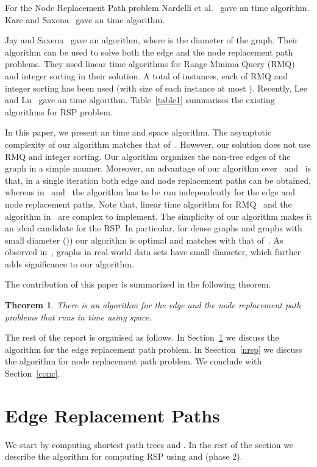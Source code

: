 \documentclass[11pt,a4paper]{llncs}
\newtheorem{thm}{Theorem}
\begin{document}
For the Node Replacement Path problem Nardelli et al.~\cite{mostvn} gave an 
time algorithm. Kare and Saxena~\cite{asksax} gave an  time algorithm.

Jay and Saxena~\cite{jay} gave an  algorithm, where  is the diameter of the graph.
Their algorithm can be used to solve both the edge and the node
replacement path problems. They used linear time algorithms for Range Minima Query
(RMQ)~\cite{rmq} and integer sorting in their solution. A total of  instances, each of
RMQ and integer sorting has been used (with size of each instance at most ).
Recently, Lee and Lu~\cite{linearrsp} gave an  time algorithm.
Table~\ref{table1} summarises the existing algorithms for RSP problem.

In this paper, we present an  time and  space algorithm.
The asymptotic complexity of our algorithm matches that of~\cite{jay}. However, our solution does not use RMQ
and integer sorting. Our algorithm organizes the non-tree edges of the graph in a simple manner.
Moreover, an advantage of our algorithm over~\cite{jay} and~\cite{linearrsp} is that, in a single iteration both
edge and node replacement paths can be obtained, whereas in~\cite{jay} and~\cite{linearrsp} the algorithm has to
be run independently for the edge and node replacement paths. Note that, linear time algorithm for RMQ~\cite{rmq}
and the algorithm in~\cite{linearrsp} are complex to implement. The simplicity of our algorithm
makes it an ideal candidate for the RSP. In particular, for dense graphs and graphs with small diameter
()) our algorithm is optimal and matches with that of~\cite{linearrsp}.
As observed in~\cite{jay}, graphs in real world data sets have small diameter, which further adds significance
to our algorithm.

The contribution of this paper is summarized in the following theorem.

\begin{thm}
\label{thm1}
There is an algorithm for the edge and the node replacement path problems that runs in
 time using  space.
\end{thm}

The rest of the report is organised as follows. In Section~\ref{ersp} we discuss the
algorithm for the edge replacement path problem. In Seection~\ref{nrsp} we discuss the
algorithm for node replacement path problem. We conclude with Section~\ref{conc}.
\section{Edge Replacement Paths}
\label{ersp}
We start by computing shortest path trees  and . In the rest of the section
we describe the algorithm for computing RSP using  and  (phase 2).
\end{document}
